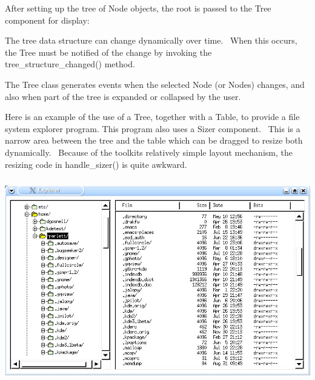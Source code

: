 
\bigskip

After setting up the tree of \textsf{Node} objects, the root is passed
to the \textsf{Tree} component for display:


The tree data structure can change dynamically over time. \ When this
occurs, the \textsf{Tree} must be notified of the change by invoking
the \textsf{tree\_structure\_changed()} method. \ 

The \textsf{Tree} class generates events when the selected \textsf{Node}
(or \textsf{Node}s) changes, and also when part of the tree is expanded
or collapsed by the user.

Here is an example of the use of a \textsf{Tree}, together with a
\textsf{Table}, to provide a file system explorer program. This program
also uses a \textsf{Sizer} component. \ This is a narrow area between
the tree and the table which can be dragged to resize both dynamically.
\ Because of the toolkit{\textquotesingle}s relatively simple layout
mechanism, the resizing code in \textsf{handle\_sizer()} is quite
awkward.



\begin{center}
\includegraphics[width=5.8134in,height=3.4898in]{ub-img/ub-img54.jpg}
\end{center}

